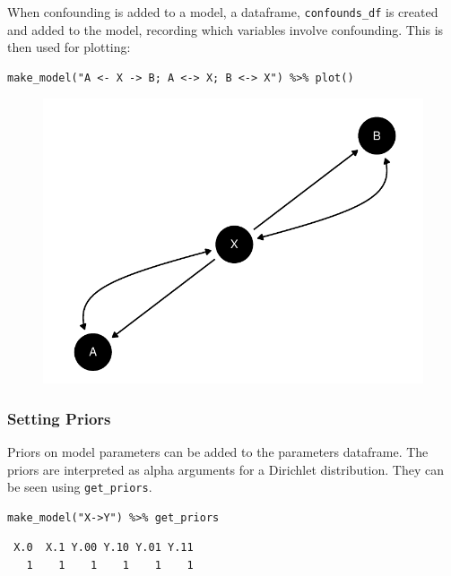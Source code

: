 \documentclass[
  article]{jss}
\begin{document}
When confounding is added to a model, a dataframe,
\texttt{confounds\_df} is created and added to the model, recording
which variables involve confounding. This is then used for plotting:

\begin{verbatim}
make_model("A <- X -> B; A <-> X; B <-> X") %>% plot()
\end{verbatim}

\begin{figure}[H]

{\centering \includegraphics{paper_files/figure-pdf/unnamed-chunk-19-1.pdf}

}

\end{figure}

\hypertarget{priors}{%
\subsubsection{Setting Priors}\label{priors}}

Priors on model parameters can be added to the parameters dataframe. The
priors are interpreted as alpha arguments for a Dirichlet distribution.
They can be seen using \texttt{get\_priors}.

\begin{verbatim}
make_model("X->Y") %>% get_priors
\end{verbatim}

\begin{verbatim}
 X.0  X.1 Y.00 Y.10 Y.01 Y.11 
   1    1    1    1    1    1 
\end{verbatim}
\end{document}
